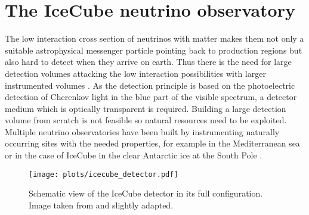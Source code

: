 \chapter{The IceCube neutrino observatory}
  \label{chap:icecube}

The low interaction cross section of neutrinos with matter makes them not only a suitable astrophysical messenger particle pointing back to production regions but also hard to detect when they arrive on earth.
Thus there is the need for large detection volumes attacking the low interaction possibilities with larger instrumented volumes .
As the detection principle is based on the photoelectric detection of Cherenkov light in the blue part of the visible spectrum, a detector medium which is optically transparent is required.
Building a large detection volume from scratch is not feasible so natural resources need to be exploited.
Multiple neutrino observatories have been built by instrumenting naturally occurring sites with the needed properties, for example in the Mediterranean sea or in the case of IceCube in the clear Antarctic ice at the South Pole .

\begin{figure}[htbp]
  \centering
  \texttt{[image: plots/icecube\_detector.pdf]}
  \caption{
    Schematic view of the IceCube detector in its full configuration.
    Image taken from  and slightly adapted.
  }
  \label{fig:icecube_detector}
\end{figure}


